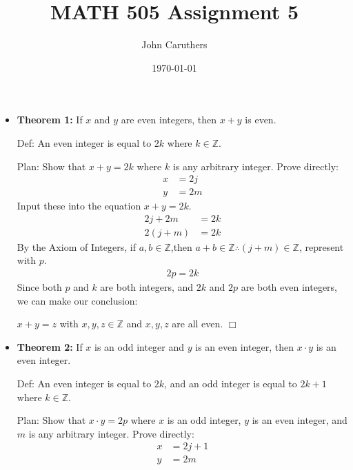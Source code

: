 \documentclass{article}
\title{MATH 505 Assignment 5}
\author{John Caruthers}
\date\today
\begin{document}
\maketitle

\begin{itemize}
    \item[] \textbf{Theorem 1:} If $x$ and $y$ are even integers, then $x+y$ is even.
    
    \hspace*{0.5cm}Def: An even integer is equal to $2k$ where $k\in\mathbb{Z}$.
    
    \hspace*{0.5cm}Plan: Show that $x+y=2k$ where $k$ is any arbitrary integer. Prove directly:
    \begin{align}
        x&=2j\nonumber\\
        y&=2m\nonumber
    \end{align}
    \hspace*{0.5cm}Input these into the equation $x+y=2k$.
    \begin{align}
        2j+2m&=2k\nonumber\\
        2(j+m)&=2k\nonumber
    \end{align}
    \hspace*{0.5cm}By the Axiom of Integers, if $a,b\in\mathbb{Z}$,then $a+b\in\mathbb{Z}\therefore(j+m)\in\mathbb{Z}$, represent with $p$.
    \begin{align}
        2p=2k\nonumber
    \end{align}
    \hspace*{0.5cm}Since both $p$ and $k$ are both integers, and $2k$ and $2p$ are both even integers, we can make our conclusion:
    
    \hspace*{0.5cm}$x+y=z$ with $x,y,z\in\mathbb{Z}$ and $x,y,z$ are all even. $\Box$
    
    \item[] \textbf{Theorem 2:} If $x$ is an odd integer and $y$ is an even integer, then $x\cdot y$ is an even integer.
    
    \hspace*{0.5cm}Def: An even integer is equal to $2k$, and an odd integer is equal to $2k+1$ where $k\in\mathbb{Z}$.
    
    \hspace*{0.5cm}Plan: Show that $x\cdot y=2p$ where $x$ is an odd integer, $y$ is an even integer, and $m$ is any arbitrary integer. \hspace*{1.4cm}Prove directly:
    \begin{align}
        x&=2j+1\nonumber\\
        y&=2m\nonumber
    \end{align}
    

\end{itemize}
\end{document}
